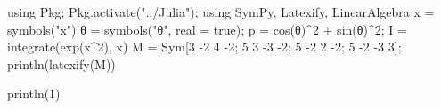 \documentclass{article}
\newcommand\jltex[1]{\jl{tex(#1)}}
\begin{document}
\begin{juliacode}
	using Pkg;
	Pkg.activate("../Julia");
	using SymPy, Latexify, LinearAlgebra
	x = symbols("x")
	θ = symbols("θ", real = true);
	p = cos(θ)^2 + sin(θ)^2;
	I = integrate(exp(x^2), x)
	M = Sym[3 -2  4 -2; 5  3 -3 -2; 5 -2  2 -2; 5 -2 -3  3];
	println(latexify(M))
\end{juliacode}


\begin{juliacode}
	println(1)
\end{juliacode}
\end{document}
